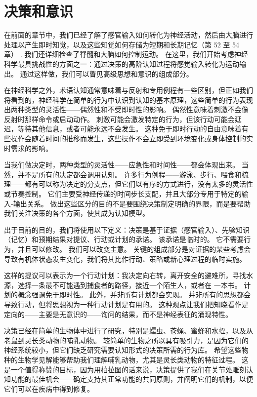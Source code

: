 \chapter{决策和意识} \label{chap:chap56}
在前面的章节中，我们已经了解了感官输入如何转化为神经活动，然后由大脑进行处理以产生即时知觉，以及这些知觉如何存储为短期和长期记忆（第 52 至 54 章） . 我们还详细检查了脊髓和大脑如何控制运动。 在这里，我们开始考虑神经科学最具挑战性的方面之一：通过决策的高阶认知过程将感觉输入转化为运动输出。 通过这样做，我们可以瞥见高级思想和意识的组成部分。

在神经科学之外，术语认知通常意味着与反射和专用例程有一些区别，但正如我们将看到的，神经科学在简单的行为中认识到认知的基本原理，这些简单的行为表现出两种类型的灵活性——偶然性和不受即时性的影响。 偶然性意味着刺激不会像反射时那样命令或启动动作。 刺激可能会激发特定的行为，但该行动可能会延迟，等待其他信息，或者可能永远不会发生。 这种免于即时行动的自由意味着有些操作会随着时间的推移而发生，这些操作不会立即受到环境变化或身体控制的实时需求的影响。

当我们做决定时，两种类型的灵活性——应急性和时间性——都会体现出来。 当然，并不是所有的决定都会调用认知。 许多行为例程——游泳、步行、喂食和梳理——都有可以称为决定的分支点，但它们以有序的方式进行，没有太多的灵活性或节奏控制。 它们主要受神经传递的时间步长支配，并且大部分专用于特定的输入-输出关系。 做出这些区分的目的不是要围绕决策制定明确的界限，而是要帮助我们关注决策的各个方面，使其成为认知模型。

出于目前的目的，我们将使用以下定义：决策是基于证据（感官输入）、先验知识（记忆）和预期结果对提议、行动或计划的承诺。 该承诺是临时的。 它不需要行为，并且可以修改。 我们可以改变主意。 关键的组成部分是对证据的某些考虑会导致有机体状态发生变化，我们将其比作行动、策略或新心理过程的临时实施。

这样的提议可以表示为一个行动计划：我决定向右转，离开安全的避难所，寻找水源，选择一条最不可能遇到捕食者的路径，接近一个陌生人，或者在 一本书。 计划的概念强调免于即时性。 此外，并非所有计划都会实现。 并非所有的思想都会导致行动，但将思想视为一种行动计划是有用的。 这种观点让我们把知晓看作是定向的——主要是无意识的——询问的结果，而不是神经表征的涌现特性。

决策已经在简单的生物体中进行了研究，特别是蠕虫、苍蝇、蜜蜂和水蛭，以及从老鼠到灵长类动物的哺乳动物。 较简单的生物之所以具有吸引力，是因为它们的神经系统较小，但它们缺乏研究需要认知形式的决策所需的行为库。 希望这些物种的生物学见解能够帮助我们理解哺乳动物，尤其是灵长类动物的特征过程。 这是一个值得称赞的目标，因为用柏拉图的话来说，决策提供了我们在关节处雕刻认知功能的最佳机会——确定支持其正常功能的共同原则，并阐明它们的机制，以便它们可以在疾病中得到修复。

